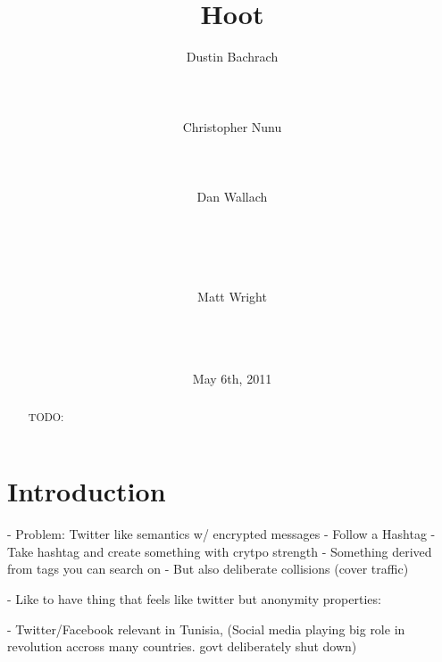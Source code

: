 \documentclass{acm_proc_article-sp}
\begin{document}

\author{
\alignauthor
	Dustin Bachrach\\
	\\
	\\
	\\
\alignauthor
 	Christopher Nunu\\
	\\
	\\
	\\
\alignauthor
	Dan Wallach\\
	\\
	\\
	\\
	\\
\and
\alignauthor
	Matt Wright\\
	\\
	\\
	\\
}

\title{Hoot}
\date{May 6th, 2011}

\maketitle

\begin{abstract}

TODO:

\end{abstract}

\section{Introduction}

- Problem: Twitter like semantics w/ encrypted messages
	- Follow a Hashtag
	- Take hashtag and create something with crytpo strength
	- Something derived from tags you can search on
	- But also deliberate collisions (cover traffic)
	
- Like to have thing that feels like twitter but anonymity properties:

- Twitter/Facebook relevant in Tunisia, (Social media playing big role in revolution accross many countries. govt deliberately shut down)
\end{document}
